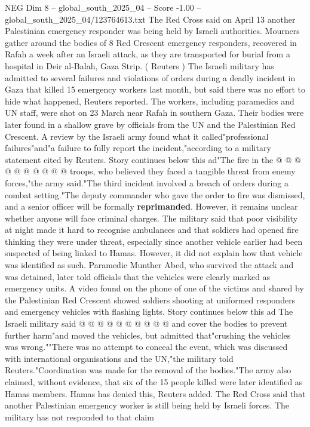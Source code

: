 \begin{textsample}{NEG Dim 8 – global\_south\_2025\_04 – Score -1.00 – global\_south\_2025\_04/123764613.txt}  \label{ex:f8_neg_278}
The Red Cross said on April 13 another Palestinian emergency responder was being held by Israeli authorities.
Mourners gather around the bodies of 8 Red Crescent emergency responders, recovered in Rafah a week after an Israeli attack, as they are transported for burial from a hospital in Deir al-Balah, Gaza Strip. ( Reuters ) The Israeli military has admitted to several failures and violations of orders during a deadly incident in Gaza that killed 15 emergency workers last month, but said there was no effort to hide what happened, Reuters reported.
The workers, including paramedics and UN staff, were shot on 23 March near Rafah in southern Gaza.
Their bodies were later found in a shallow grave by officials from the UN and the Palestinian Red Crescent.
A review by the Israeli army found what it called"professional failures"and"a failure to fully report the incident,"according to a military statement cited by Reuters.
Story continues below this ad"The fire in the @ @ @ @ @ @ @ @ @ @ troops, who believed they faced a tangible threat from enemy forces,"the army said."The third incident involved a breach of orders during a combat setting."The deputy commander who gave the order to fire was dismissed, and a senior officer will be formally \textbf{reprimanded}.
However, it remains unclear whether anyone will face criminal charges.
The military said that poor visibility at night made it hard to recognise ambulances and that soldiers had opened fire thinking they were under threat, especially since another vehicle earlier had been suspected of being linked to Hamas.
However, it did not explain how that vehicle was identified as such.
Paramedic Munther Abed, who survived the attack and was detained, later told officials that the vehicles were clearly marked as emergency units.
A video found on the phone of one of the victims and shared by the Palestinian Red Crescent showed soldiers shooting at uniformed responders and emergency vehicles with flashing lights.
Story continues below this ad The Israeli military said @ @ @ @ @ @ @ @ @ @ and cover the bodies to prevent further harm"and moved the vehicles, but admitted that"crushing the vehicles was wrong.""There was no attempt to conceal the event, which was discussed with international organisations and the UN,"the military told Reuters."Coordination was made for the removal of the bodies."The army also claimed, without evidence, that six of the 15 people killed were later identified as Hamas members.
Hamas has denied this, Reuters added.
The Red Cross said that another Palestinian emergency worker is still being held by Israeli forces.
The military has not responded to that claim

\end{textsample}
